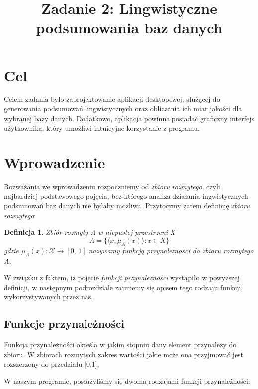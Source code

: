 \documentclass{classrep}
\author{
\studentinfo{Mateusz Walczak}{216911} \and
\studentinfo{Konrad Kajszczak}{216790}
}
\title{Zadanie 2: Lingwistyczne podsumowania baz danych}
\newtheorem{definition}{Definicja}
\begin{document}
\maketitle

\section{Cel}
Celem zadania było zaprojektowanie aplikacji desktopowej, służącej do generowania podsumowań lingwistycznych oraz obliczania ich miar jakości dla wybranej bazy danych. Dodatkowo, aplikacja powinna posiadać graficzny interfejs użytkownika, który umożliwi intuicyjne korzystanie z programu.


\section{Wprowadzenie}
Rozważania we wprowadzeniu rozpoczniemy od \emph{zbioru rozmytego}, czyli najbardziej podstawowego pojęcia, bez którego analiza działania ingwistycznych podsumowań baz danych nie byłaby mozliwa. Przytoczmy zatem definicję \emph{zbioru rozmytego}:

\begin{definition}
Zbiór rozmyty A w niepustej przestrzeni X \cite{zadech}
\[A = \{\langle x, \mu_A(x)\rangle: x \in X \} \]
gdzie \(\mu_A(x) : \mathcal{X} \to [0,\,1]\) nazywamy \emph{funkcją
przynależności do zbioru rozmytego \(A\)}.
\end{definition}

W związku z faktem, iż pojęcie \emph{funkcji przynależności} wystąpiło w powyższej definicji, w następnym podrozdziale zajmiemy się opisem tego rodzaju funkcji, wykorzystywanych przez nas.



\subsection{Funkcje przynależności}

Funkcja przynależności określa w jakim stopniu dany element przynależy do zbioru. W zbiorach rozmytych zakres wartości jakie może ona przyjmować jest rozszerzony do przedziału [0,1]. \newline

W naszym programie, posłużyliśmy się dwoma rodzajami funkcji przynależności:
\end{document}
